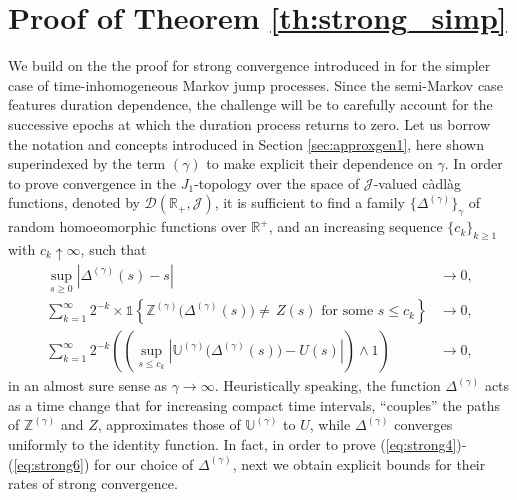 \documentclass[11pt,leqno]{amsart}
\numberwithin{table}{section}
\numberwithin{figure}{section}
\numberwithin{equation}{section}
\newcommand{\1}{{\mathds{1}}}
\newcommand{\0}{\mat{0}}
\begin{document}
{\section{Proof of Theorem \ref{th:strong_simp}}\label{sec:strongSMJP}
We build on the the proof for strong convergence introduced in \cite{bladt_peralta}   for the simpler case of time-inhomogeneous Markov jump processes. Since the semi-Markov case features duration dependence, the challenge will be to carefully account for the successive epochs at which the duration process returns to zero.  Let us borrow the notation and concepts introduced in Section \ref{sec:approxgen1}, here shown superindexed by the term $(\gamma)$ to make explicit their dependence on $\gamma$. In order to prove convergence in the $J_1$-topology over the space of $\mathcal{J}$-valued c\`adl\`ag functions, denoted by $\mathcal{D}(\mathds{R}_+,\mathcal{J})$, it is sufficient to find a family $\{\Delta^{(\gamma)}\}_{\gamma}$ of random homoeomorphic functions over $\mathds{R}^+$, and an increasing sequence $\{c_k\}_{k\ge 1}$ with $c_k\uparrow\infty$, such that
\begin{align}
\sup_{s\ge 0}|\Delta^{(\gamma)}(s) - s|&\rightarrow 0,\label{eq:strong4}\\
\sum_{k=1}^{\infty}2^{-k}\times\mathds{1} \left\{\mathbb{Z}^{(\gamma)}\big(\Delta^{(\gamma)}(s)\big)\neq\, Z(s)\mbox{ for some }s\le c_k\right\}&\rightarrow 0,\label{eq:strong5}\\
\sum_{k=1}^{\infty}2^{-k}\left(\left(\sup_{s\le c_k}\left|\mathbb{U}^{(\gamma)}\big(\Delta^{(\gamma)}(s)\big)- U(s)\right|\right)\wedge 1\right)&\rightarrow 0,\label{eq:strong6}
\end{align}
in an almost sure sense as $\gamma\rightarrow\infty$. Heuristically speaking, the function $\Delta^{(\gamma)}$ acts as a time change that for increasing compact time intervals, ``couples'' the paths of $\mathbb{Z}^{(\gamma)}$ and $Z$, approximates those of $\mathbb{U}^{(\gamma)}$ to $U$, while $\Delta^{(\gamma)}$ converges uniformly to the identity function. In fact, in order to prove (\ref{eq:strong4})-(\ref{eq:strong6}) for our choice of $\Delta^{(\gamma)}$, next we obtain explicit bounds for their rates of strong convergence.

}
\end{document}
